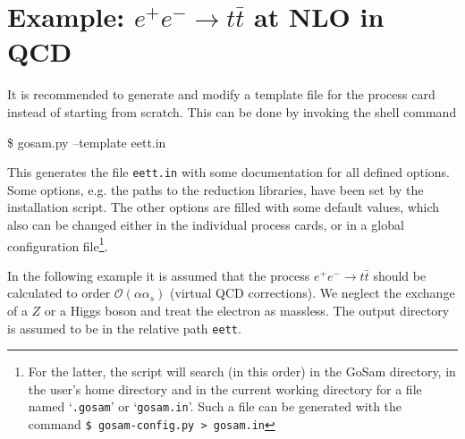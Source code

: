 \documentclass[11pt,a4paper]{refrep}
\newcommand{\gosamversion}{{2{.}0}}
\newcommand{\gosamv}[1][\gosamversion]{{\sc GoSam}\xspace}
\begin{document}
\section{Example: \texorpdfstring{$e^+e^-\rightarrow t\bar{t}$}{e+e- to tt-bar}
at NLO in QCD}

It is recommended to generate and modify a template file for the 
process card instead of
starting from scratch. This can be done by invoking the shell command
\begin{example}
\$ gosam.py --template eett.in
\end{example}
This generates the file \texttt{eett.in} with some documentation
for all defined options. Some options, e.g. the paths to the reduction libraries, 
have been set by the installation script.
The other options are filled with some default values,
which also can be changed either in the individual process cards, 
or in a global configuration file\footnote{
For the latter, the script will search (in this order) in the \gosamv{} directory,
in the user's home directory and in the current working directory for a file
named `\texttt{.gosam}' or `\texttt{gosam.in}'. Such a file can be generated
with the command
{\tt \$ gosam-config.py > gosam.in}}.

In the following  example it is assumed that the process
$e^+e^-\rightarrow t\bar{t}$ should be calculated to order
$\mathcal{O}(\alpha\alpha_s)$ (virtual QCD corrections).
We neglect the exchange of a $Z$ or a Higgs boson and treat the electron as massless.
The output directory is assumed to be in the relative path
\texttt{eett}. 
\end{document}
